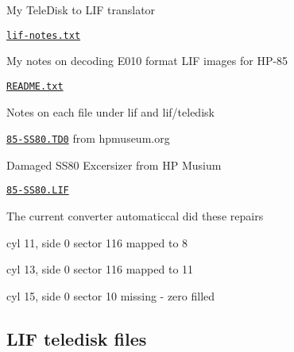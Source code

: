 \begin{DoxyItemize}
\begin{DoxyItemize}
\begin{DoxyItemize}
\begin{DoxyItemize}
\item My Tele\+Disk to L\+IF translator
\end{DoxyItemize}
\item \href{lif/lif-notes.txt}{\tt lif-\/notes.\+txt}
\begin{DoxyItemize}
\item My notes on decoding E010 format L\+IF images for H\+P-\/85
\end{DoxyItemize}
\item \href{lif/README.txt}{\tt R\+E\+A\+D\+M\+E.\+txt}
\begin{DoxyItemize}
\item Notes on each file under lif and lif/teledisk
\end{DoxyItemize}
\item \href{lif/85-SS80.TD0}{\tt 85-\/\+S\+S80.\+T\+D0} from hpmuseum.\+org
\begin{DoxyItemize}
\item Damaged S\+S80 Excersizer from HP Musium
\end{DoxyItemize}
\item \href{lif/85-SS80.LIF}{\tt 85-\/\+S\+S80.\+L\+IF}
\begin{DoxyItemize}
\item The current converter automaticcal did these repairs
\begin{DoxyItemize}
\item cyl 11, side 0 sector 116 mapped to 8
\item cyl 13, side 0 sector 116 mapped to 11
\item cyl 15, side 0 sector 10 missing -\/ zero filled
\end{DoxyItemize}
\end{DoxyItemize}
\end{DoxyItemize}
\end{DoxyItemize}
\end{DoxyItemize}

\subsection*{L\+IF teledisk files}


